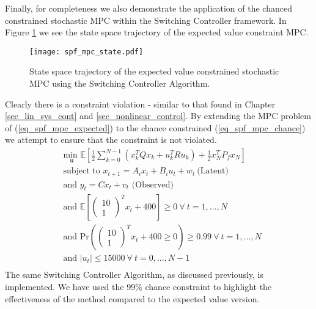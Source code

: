 Finally, for completeness we also demonstrate the application of the chanced constrained stochastic MPC within the Switching Controller framework. In Figure \ref{fig_spf_mpc_state} we see the state space trajectory of the expected value constraint MPC.
\begin{figure}[H] 
\centering
\texttt{[image: spf\_mpc\_state.pdf]}
\caption{State space trajectory of the expected value constrained stochastic MPC using the Switching Controller Algorithm.}
\label{fig_spf_mpc_state}
\end{figure}
Clearly there is a constraint violation - similar to that found in Chapter \ref{sec_lin_sys_cont} and \ref{sec_nonlinear_control}. By extending the MPC problem of (\ref{eq_spf_mpc_expected}) to the chance constrained (\ref{eq_spf_mpc_chance}) we attempt to ensure that the constraint is not violated. 
\begin{equation}
\begin{aligned}
&\underset{\mathbf{u}}{\text{min }} \mathbb{E}\left[ \frac{1}{2}\sum_{k=0}^{N-1} \left( x_k^TQx_k + u_k^TRu_k \right) + \frac{1}{2}x_N^TP_fx_N \right] \\
& \text{subject to } x_{t+1}=A_ix_t+B_iu_t + w_t~\text{(Latent)} \\
& \text{and } y_{t}= Cx_t + v_t \text{ (Observed)}\\
& \text{and } \mathbb{E}[\begin{pmatrix}
10 \\ 1
\end{pmatrix}^Tx_t + 400] \geq 0 ~\forall ~t=1,...,N \\
& \text{and } \text{Pr}(\begin{pmatrix}
10 \\ 1
\end{pmatrix}^T x_t + 400 \geq 0) \geq 0.99 ~\forall ~t=1,...,N\\
& \text{and } |u_t| \leq 15000 ~\forall ~t=0,...,N-1\\
\end{aligned}
\label{eq_spf_mpc_chance}
\end{equation} 
The same Switching Controller Algorithm, as discussed previously, is implemented. We have used the 99\% chance constraint to highlight the effectiveness of the method compared to the expected value version. 

